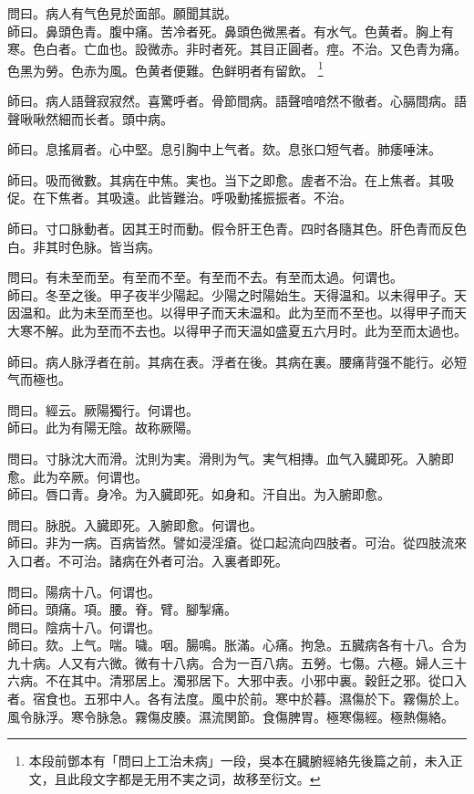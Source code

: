 問曰。病人有气色見於面部。願聞其説。\\
師曰。鼻頭色青。腹中痛。苦冷者死。鼻頭色微黑者。有水气。色黄者。胸上有寒。色白者。亡血也。設微赤。非时者死。其目正圓者。痙。不治。又色青为痛。色黑为勞。色赤为風。色黄者便難。色鲜明者有留飲。
	\footnote{
		本段前鄧本有「問曰上工治未病」一段，吳本在臓腑經絡先後篇之前，未入正文，且此段文字都是无用不実之词，故移至衍文。
	}

師曰。病人語聲寂寂然。喜驚呼者。骨節間病。語聲喑喑然不徹者。心膈間病。語聲啾啾然細而长者。頭中病。

師曰。息搖肩者。心中堅。息引胸中上气者。欬。息张口短气者。肺痿唾沫。

師曰。吸而微數。其病在中焦。実也。当下之即愈。虗者不治。在上焦者。其吸促。在下焦者。其吸遠。此皆難治。呼吸動搖振振者。不治。

師曰。寸口脉動者。因其王时而動。假令肝王色青。四时各隨其色。肝色青而反色白。非其时色脉。皆当病。

問曰。有未至而至。有至而不至。有至而不去。有至而太過。何谓也。\\
師曰。冬至之後。甲子夜半少陽起。少陽之时陽始生。天得温和。以未得甲子。天因温和。此为未至而至也。以得甲子而天未温和。此为至而不至也。以得甲子而天大寒不解。此为至而不去也。以得甲子而天温如盛夏五六月时。此为至而太過也。

師曰。病人脉浮者在前。其病在表。浮者在後。其病在裏。腰痛背强不能行。必短气而極也。

問曰。經云。厥陽獨行。何谓也。\\
師曰。此为有陽无陰。故称厥陽。

問曰。寸脉沈大而滑。沈則为実。滑則为气。実气相摶。血气入臓即死。入腑即愈。此为卒厥。何谓也。\\
師曰。唇口青。身冷。为入臓即死。如身和。汗自出。为入腑即愈。

問曰。脉脱。入臓即死。入腑即愈。何谓也。\\
師曰。非为一病。百病皆然。譬如浸淫瘡。從口起流向四肢者。可治。從四肢流來入口者。不可治。{\khaaitp 諸}病在外者可治。入裏者即死。

問曰。陽病十八。何谓也。\\
師曰。頭痛。項。腰。脊。臂。腳掣痛。\\
問曰。陰病十八。何谓也。\\
師曰。欬。上气。喘。噦。咽。腸鳴。胀滿。心痛。拘急。五臓病各有十八。合为九十病。人又有六微。微有十八病。合为一百八病。五勞。七傷。六極。婦人三十六病。不在其中。清邪居上。濁邪居下。大邪中表。小邪中裏。穀飪之邪。從口入者。宿食也。五邪中人。各有法度。風中於前。寒中於暮。濕傷於下。霧傷於上。風令脉浮。寒令脉急。霧傷皮腠。濕流関節。食傷脾胃。極寒傷經。極熱傷絡。

